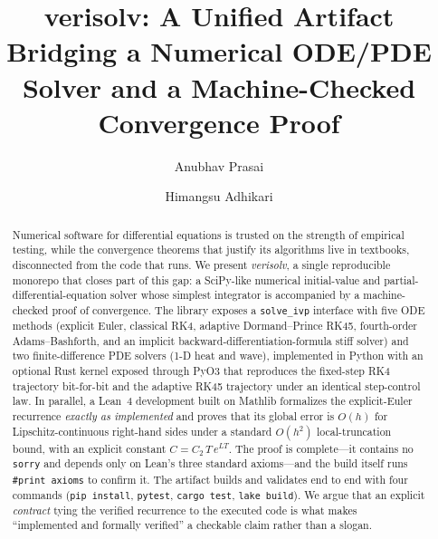 \documentclass[sigplan,nonacm,screen,review]{acmart}
\begin{document}
\title{verisolv: A Unified Artifact Bridging a Numerical ODE/PDE Solver and a
Machine-Checked Convergence Proof}

\author{Anubhav Prasai}

\author{Himangsu Adhikari}

\begin{abstract}
Numerical software for differential equations is trusted on the strength of
empirical testing, while the convergence theorems that justify its algorithms
live in textbooks, disconnected from the code that runs. We present
\emph{verisolv}, a single reproducible monorepo that closes part of this gap: a
SciPy-like numerical initial-value and partial-differential-equation
solver whose simplest integrator is accompanied by a machine-checked proof of
convergence. The library exposes a \texttt{solve\_ivp} interface with five ODE
methods (explicit Euler, classical RK4, adaptive Dormand--Prince RK45,
fourth-order Adams--Bashforth, and an implicit backward-differentiation-formula
stiff solver) and two finite-difference PDE solvers (1-D heat and wave),
implemented in Python with an optional Rust kernel exposed through PyO3 that
reproduces the fixed-step RK4 trajectory bit-for-bit and the adaptive RK45
trajectory under an identical step-control law. In parallel, a Lean~4 development
built on Mathlib formalizes the explicit-Euler recurrence \emph{exactly as
implemented} and proves that its global error is $O(h)$ for Lipschitz-continuous
right-hand sides under a standard $O(h^2)$ local-truncation bound, with an
explicit constant $C = C_2\,T\,e^{LT}$. The proof is complete---it contains no
\texttt{sorry} and depends only on Lean's three standard axioms---and the build
itself runs \texttt{\#print axioms} to confirm it. The artifact builds and
validates end to end with four commands (\texttt{pip install}, \texttt{pytest},
\texttt{cargo test}, \texttt{lake build}). We argue that an explicit
\emph{contract} tying the verified recurrence to the executed code is what makes
``implemented and formally verified'' a checkable claim rather than a slogan.
\end{abstract}


\maketitle
\end{document}
